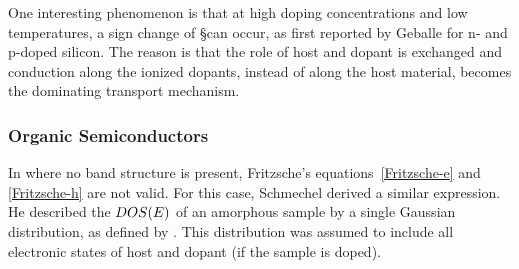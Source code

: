 One interesting phenomenon is that at high doping concentrations and low temperatures, a sign change of \S can occur, as first reported by Geballe\etal\cite{Geballe1955} for n- and p-doped silicon. The reason is that the role of host and dopant is exchanged and conduction along the ionized dopants, instead of along the host material, becomes the dominating transport mechanism.

\subsubsection{Organic Semiconductors}%
\label{sec:TheoSchmechel}
In \OSCs where no band structure is present, Fritzsche's equations~\eqref{Fritzsche-e} and \eqref{Fritzsche-h} are not valid. For this case, Schmechel derived a similar expression\cite{Schmechel2003}. He described the \dosLong $DOS(E)$ of an amorphous sample by a single Gaussian distribution, as defined by .
This distribution was assumed to include all electronic states of host and dopant (if the sample is doped).


